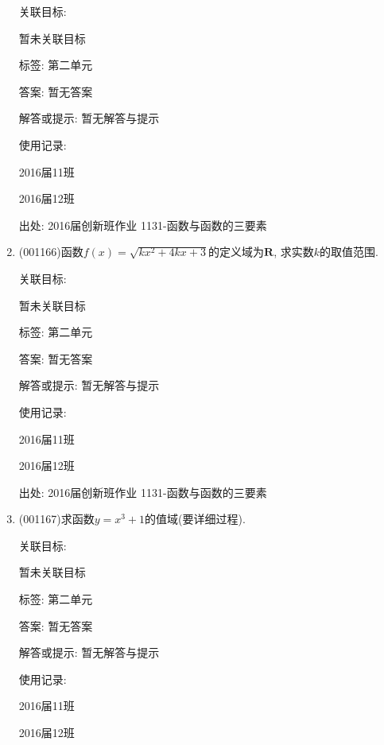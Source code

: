 \documentclass[10pt,a4paper]{article}
\begin{document}
\begin{enumerate}[1.]
关联目标:

暂未关联目标



标签: 第二单元

答案: 暂无答案

解答或提示: 暂无解答与提示

使用记录:

2016届11班			

2016届12班			


出处: 2016届创新班作业	1131-函数与函数的三要素
\item { (001166)}函数$f(x)=\sqrt{kx^2+4kx+3}$的定义域为$\mathbf{R}$, 求实数$k$的取值范围.


关联目标:

暂未关联目标



标签: 第二单元

答案: 暂无答案

解答或提示: 暂无解答与提示

使用记录:

2016届11班	

2016届12班	


出处: 2016届创新班作业	1131-函数与函数的三要素
\item { (001167)}求函数$y=x^3+1$的值域(要详细过程).


关联目标:

暂未关联目标



标签: 第二单元

答案: 暂无答案

解答或提示: 暂无解答与提示

使用记录:

2016届11班	

2016届12班	



\end{enumerate}
\end{document}
